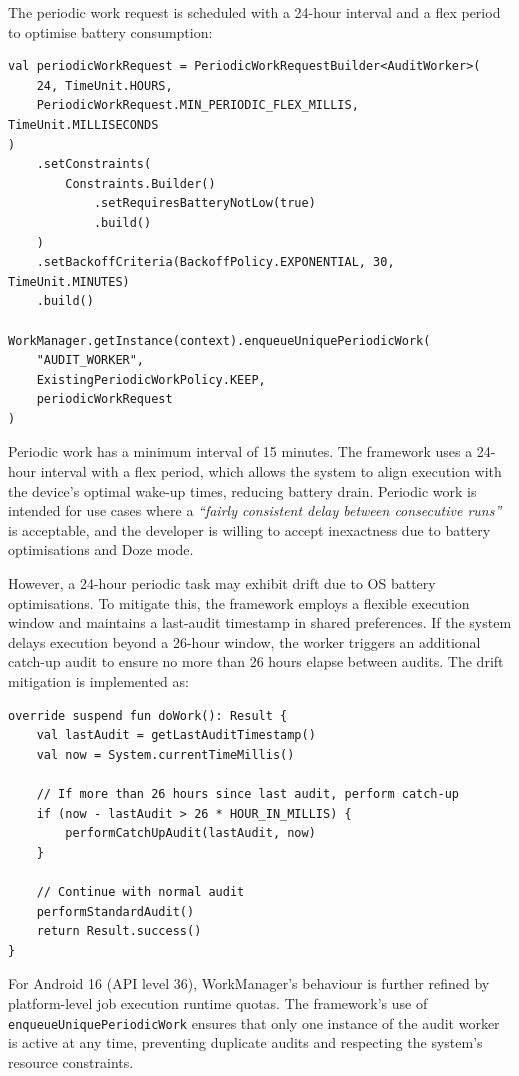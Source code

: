 The periodic work request is scheduled with a 24-hour interval and a flex period to optimise battery consumption:

\begin{lstlisting}[caption=Scheduling the periodic audit]
val periodicWorkRequest = PeriodicWorkRequestBuilder<AuditWorker>(
    24, TimeUnit.HOURS,
    PeriodicWorkRequest.MIN_PERIODIC_FLEX_MILLIS, TimeUnit.MILLISECONDS
)
    .setConstraints(
        Constraints.Builder()
            .setRequiresBatteryNotLow(true)
            .build()
    )
    .setBackoffCriteria(BackoffPolicy.EXPONENTIAL, 30, TimeUnit.MINUTES)
    .build()

WorkManager.getInstance(context).enqueueUniquePeriodicWork(
    "AUDIT_WORKER",
    ExistingPeriodicWorkPolicy.KEEP,
    periodicWorkRequest
)
\end{lstlisting}

Periodic work has a minimum interval of 15 minutes. The framework uses a 24-hour interval with a flex period, which allows the system to align execution with the device's optimal wake-up times, reducing battery drain. Periodic work is intended for use cases where a \textit{``fairly consistent delay between consecutive runs''} is acceptable, and the developer is willing to accept inexactness due to battery optimisations and Doze mode.

However, a 24-hour periodic task may exhibit drift due to OS battery optimisations. To mitigate this, the framework employs a flexible execution window and maintains a last-audit timestamp in shared preferences. If the system delays execution beyond a 26-hour window, the worker triggers an additional catch-up audit to ensure no more than 26 hours elapse between audits. The drift mitigation is implemented as:

\begin{lstlisting}[caption=Drift mitigation in AuditWorker]
override suspend fun doWork(): Result {
    val lastAudit = getLastAuditTimestamp()
    val now = System.currentTimeMillis()
    
    // If more than 26 hours since last audit, perform catch-up
    if (now - lastAudit > 26 * HOUR_IN_MILLIS) {
        performCatchUpAudit(lastAudit, now)
    }
    
    // Continue with normal audit
    performStandardAudit()
    return Result.success()
}
\end{lstlisting}

For Android 16 (API level 36), WorkManager's behaviour is further refined by platform-level job execution runtime quotas. The framework's use of \texttt{enqueueUniquePeriodicWork} ensures that only one instance of the audit worker is active at any time, preventing duplicate audits and respecting the system's resource constraints.

